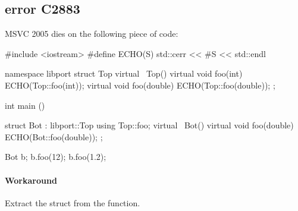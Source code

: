 \documentclass[openright,twoside,11pt]{book}
\newenvironment{workaround}{\paragraph{Workaround}}{}
\begin{document}
\subsection{error C2883}
MSVC 2005 dies on the following piece of code:

\begin{cxx}
#include <iostream>
#define ECHO(S) std::cerr << #S << std::endl

namespace libport
{
  struct Top
  {
    virtual ~Top() {}
    virtual void foo(int)    { ECHO(Top::foo(int)); }
    virtual void foo(double) { ECHO(Top::foo(double)); }
  };
}

int
main ()
{
  struct Bot : libport::Top
  {
    using Top::foo;
    virtual ~Bot() {}
    virtual void foo(double) { ECHO(Bot::foo(double)); }
  };

  Bot b;
  b.foo(12);
  b.foo(1.2);
}
\end{cxx}


\begin{workaround}
  Extract the struct from the function.
\end{workaround}
\end{document}
